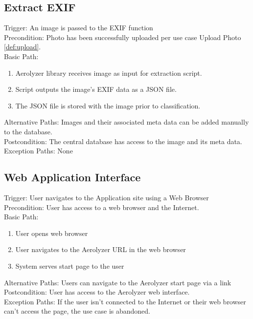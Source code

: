 \documentclass[journal,10pt,draftclsnofoot,onecolumn]{IEEEtran}
\begin{document}
\begin{singlespace}
	\subsection{Extract EXIF} \label{def:extexif}
		Trigger: An image is passed to the EXIF function\\
		Precondition: Photo has been successfully uploaded per use case Upload Photo \ref{def:upload}.\\
		Basic Path:
		\begin{enumerate} 
			\item Aerolyzer library receives image as input for extraction script.
			\item Script outputs the image's EXIF data as a JSON file.
			\item The JSON file is stored with the image prior to classification.
		\end{enumerate}
		Alternative Paths: Images and their associated meta data can be added manually to the database.\\
		Postcondition: The central database has access to the image and its meta data.\\
		Exception Paths: None

	\subsection{Web Application Interface} \label{def:webInt}
		Trigger: User navigates to the Application site using a Web Browser\\
		Precondition: User has access to a web browser and the Internet.\\
		Basic Path:
		\begin{enumerate}
			\item User opens web browser
			\item User navigates to the Aerolyzer URL in the web browser
			\item System serves start page to the user
		\end{enumerate}
		Alternative Paths: Users can navigate to the Aerolyzer start page via a link\\
		Postcondition: User has access to the Aerolyzer web interface.\\
		Exception Paths: If the user isn't connected to the Internet or their web browser can't access the page, the use case is abandoned.
	

\end{singlespace}
\end{document}
